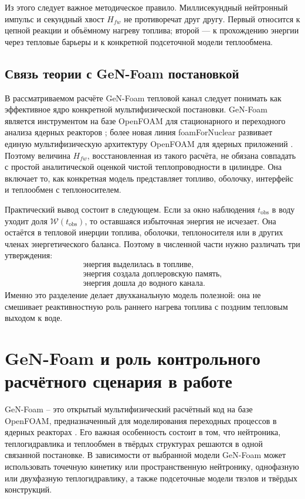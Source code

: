 \documentclass[12pt]{article}
\begin{document}
Из этого следует важное методическое правило. Миллисекундный нейтронный импульс и секундный хвост \(H_{fw}\) не противоречат друг другу. Первый относится к цепной реакции и объёмному нагреву топлива; второй --- к прохождению энергии через тепловые барьеры и к конкретной подсеточной модели теплообмена.

\subsection{Связь теории с GeN-Foam постановкой}

В рассматриваемом расчёте GeN-Foam тепловой канал следует понимать как эффективное ядро конкретной мультифизической постановки. GeN-Foam является инструментом на базе OpenFOAM для стационарного и переходного анализа ядерных реакторов \cite{GeNFoam2015}; более новая линия foamForNuclear развивает единую мультифизическую архитектуру OpenFOAM для ядерных приложений \cite{foamForNuclear2026}. Поэтому величина \(H_{fw}\), восстановленная из такого расчёта, не обязана совпадать с простой аналитической оценкой чистой теплопроводности в цилиндре. Она включает то, как конкретная модель представляет топливо, оболочку, интерфейс и теплообмен с теплоносителем.

Практический вывод состоит в следующем. Если за окно наблюдения \(t_{\mathrm{obs}}\) в воду уходит доля \(\mathcal W(t_{\mathrm{obs}})\), то оставшаяся избыточная энергия не исчезает. Она остаётся в тепловой инерции топлива, оболочки, теплоносителя или в других членах энергетического баланса. Поэтому в численной части нужно различать три утверждения:
\[
\begin{gathered}
\text{энергия выделилась в топливе},\\
\text{энергия создала доплеровскую память},\\
\text{энергия дошла до водного канала}.
\end{gathered}
\]
Именно это разделение делает двухканальную модель полезной: она не смешивает реактивностную роль раннего нагрева топлива с поздним тепловым выходом к воде.


\section{GeN-Foam и роль контрольного расчётного сценария в работе}

GeN-Foam -- это открытый мультифизический расчётный код на базе OpenFOAM, предназначенный для моделирования переходных процессов в ядерных реакторах \cite{GeNFoam2015,foamForNuclear2026}. Его важная особенность состоит в том, что нейтроника, теплогидравлика и теплообмен в твёрдых структурах решаются в одной связанной постановке. В зависимости от выбранной модели GeN-Foam может использовать точечную кинетику или пространственную нейтронику, однофазную или двухфазную теплогидравлику, а также подсеточные модели твэлов и твёрдых конструкций.
\end{document}
